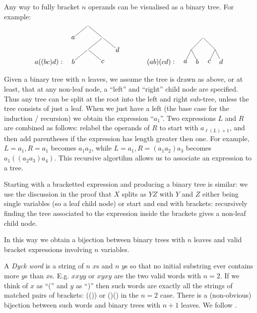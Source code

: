 \documentclass[twoside,a4paper,12pt]{article}
\theoremstyle{plain}
\theoremstyle{definition}
\begin{document}
Any way to fully bracket $n$ operands can be visualised as a binary tree.  For example:
\[
a((bc)d): \quad
\begin{tikzpicture}[level distance=4ex, every node/.style={inner sep=0pt}]
  \node {}
    child {node {$a$}}
    child {node {}
      child {node {}
         child {node {$b$}}
         child {node {$c$}}
      }
      child {node {$d$}}
    };
\end{tikzpicture}
\qquad\qquad
(ab)(cd): \quad
\begin{tikzpicture}[level distance=4ex, every node/.style={inner sep=0pt}, level 1/.style={sibling distance=8ex},
   level 2/.style={sibling distance=4ex}]
  \node {}
    child {
      child {node {$a$}}
      child {node {$b$}}
    }
    child {
      child {node {$c$}}
      child {node {$d$}}
    };
\end{tikzpicture}\]

Given a binary tree with $n$ leaves, we assume the tree is drawn as above, or at least, that at any non-leaf node, a ``left'' and ``right'' child node are specified.  Thus any tree can be split at the root into the left and right sub-tree, unless the tree consists of just a leaf.  When we just have a left (the base case for the induction / recursion) we obtain the expression ``$a_1$''.  Two expressions $L$ and $R$ are combined as follows: relabel the operands of $R$ to start with $a_{\ell(L)+1}$, and then add parentheses if the expression has length greater then one.  For example, $L=a_1, R=a_1$ becomes $a_1a_2$, while $L=a_1, R=(a_1a_2)a_3$ becomes $a_1((a_2a_3)a_4)$.  This recursive algortihm allows us to associate an expression to a tree.

Starting with a bracketted expression and producing a binary tree is similar: we use the discussion in the proof that $X$ splits as $YZ$ with $Y$ and $Z$ either being single variables (so a leaf child node) or start and end with brackets: recursively finding the tree associated to the expression inside the brackets gives a non-leaf child node.

In this way we obtain a bijection between binary trees with $n$ leaves and valid bracket expressions involving $n$ variables.

A \emph{Dyck word} is a string of $n$ $x$s and $n$ $y$s so that no initial substring ever contains more $y$s than $x$s.  E.g. $xxyy$ or $xyxy$ are the two valid words with $n=2$.  If we think of $x$ as ``('' and $y$ as ``)'' then such words are exactly all the strings of matched pairs of brackets: (()) or ()() in the $n=2$ case.
There is a (non-obvious) bijection between such words and binary trees with $n+1$ leaves.  We follow \cite{mvl}.
\end{document}
